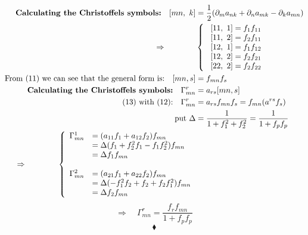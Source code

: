 \begin{align}
\textbf{Calculating the Christoffels symbols:}\quad [mn,\ k] &= \frac{1}{2} (\partial_m a_{nk}+\partial_n a_{mk}-\partial_k a_{mn})\\
\Rightarrow\quad\quad\quad\quad & \left \{ \begin{array}{c}
\ [11,\ 1] =  f_1 f_{11}\\
\ [11,\ 2] =  f_2 f_{11}\\
\ [12,\ 1] =  f_1 f_{12}\\
\ [12,\ 2] =  f_2 f_{21}\\
\ [22,\ 2] =  f_2 f_{22}\\
\end{array}\right.\\
\text{From (11) we can see that the general form is:}\quad [mn,s] &= f_{mn}f_s\\
\textbf{Calculating the Christoffels symbols:}\quad \Gamma^r_{mn} &= a_{rs}[mn,s]\\ 
\text{(13) with (12):}\quad \Gamma^r_{mn} &= a_{rs}f_{mn}f_s = f_{mn}(a^{rs}f_s)\\
\text{put } \Delta &= \frac{1}{1 + f_1 ^2+f_2 ^2}=\frac{1}{1 + f_p f_p} \\
\Rightarrow\quad\quad\quad\quad  \left \{ \begin{array}{ll}
\Gamma^1_{mn} & = (a_{11} f_1 + a_{12} f_2)f_{mn}\\
\ & =  \Delta(f_1  + f_2^2f_1 - f_1f_2^2)f_{mn}\\
\ & =  \Delta f_1 f_{mn}\\\\
\Gamma^2_{mn} & = (a_{21} f_1 + a_{22} f_2)f_{mn}\\
\ & =  \Delta(- f_1^2f_2+f_2   + f_2f_1^2)f_{mn}\\
\ & =  \Delta f_2 f_{mn}\\
\end{array}\right. & 
\end{align}
$$\Rightarrow\quad \Gamma^r_{mn} = \frac{f_r f_{mn}}{1 + f_p f_p}$$
$$\blacklozenge$$
\newpage

